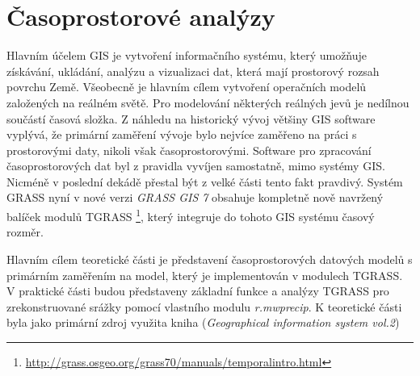 \documentclass[a4paper,12pt,oneside]{report}
\begin{document}
\section{Časoprostorové analýzy}
Hlavním účelem GIS je  vytvoření informačního systému, který umožňuje získávání, ukládání, analýzu a vizualizaci dat, která mají prostorový rozsah povrchu Země. Všeobecně je hlavním cílem vytvoření operačních modelů založených na reálném světě. Pro modelování některých reálných jevů je nedílnou součástí časová složka. Z náhledu na historický vývoj většiny GIS software vyplývá, že primární zaměření vývoje bylo nejvíce zaměřeno na práci s prostorovými daty, nikoli však časoprostorovými. Software pro zpracování  časoprostorových dat byl z pravidla vyvíjen samostatně, mimo systémy GIS. Nicméně v poslední dekádě přestal být z velké části tento fakt pravdivý.\cite{geospatialanal} Systém GRASS nyní v nové verzi \textit{GRASS GIS 7 } obsahuje kompletně nově navržený balíček modulů TGRASS \footnote{\url{http://grass.osgeo.org/grass70/manuals/temporalintro.html}}, který integruje do tohoto GIS systému časový rozměr.

Hlavním cílem teoretické části je představení časoprostorových datových modelů s primárním zaměřením na model, který je implementován v  modulech TGRASS. V praktické části budou představeny základní funkce a analýzy TGRASS pro zrekonstruované srážky pomocí vlastního modulu \textit{r.mwprecip}. K teoretické části byla jako primární zdroj využita kniha (\textit{Geographical information system vol.2})\cite{gistemporal}
\end{document}
